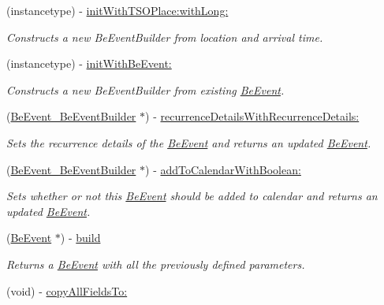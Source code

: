 \begin{DoxyCompactItemize}
\item 
(instancetype) -\/ \hyperlink{interface_be_event___be_event_builder_a3e9d355a5fc1b9f69849773e37ec7403}{init\+With\+T\+S\+O\+Place\+:with\+Long\+:}
\begin{DoxyCompactList}\small\item\em Constructs a new Be\+Event\+Builder from location and arrival time. \end{DoxyCompactList}\item 
(instancetype) -\/ \hyperlink{interface_be_event___be_event_builder_ac88487fd0f086971afac04eb51a0af0b}{init\+With\+Be\+Event\+:}
\begin{DoxyCompactList}\small\item\em Constructs a new Be\+Event\+Builder from existing \hyperlink{interface_be_event}{Be\+Event}. \end{DoxyCompactList}\item 
(\hyperlink{interface_be_event___be_event_builder}{Be\+Event\+\_\+\+Be\+Event\+Builder} $\ast$) -\/ \hyperlink{interface_be_event___be_event_builder_aa2f5445af660771f98e0940983f398cf}{recurrence\+Details\+With\+Recurrence\+Details\+:}
\begin{DoxyCompactList}\small\item\em Sets the recurrence details of the \hyperlink{interface_be_event}{Be\+Event} and returns an updated \hyperlink{interface_be_event}{Be\+Event}. \end{DoxyCompactList}\item 
(\hyperlink{interface_be_event___be_event_builder}{Be\+Event\+\_\+\+Be\+Event\+Builder} $\ast$) -\/ \hyperlink{interface_be_event___be_event_builder_a75fe88e5d200b0e3c8b2c73b3e7f8084}{add\+To\+Calendar\+With\+Boolean\+:}
\begin{DoxyCompactList}\small\item\em Sets whether or not this \hyperlink{interface_be_event}{Be\+Event} should be added to calendar and returns an updated \hyperlink{interface_be_event}{Be\+Event}. \end{DoxyCompactList}\item 
(\hyperlink{interface_be_event}{Be\+Event} $\ast$) -\/ \hyperlink{interface_be_event___be_event_builder_a032b362a94c541b08de82d68cbbe4733}{build}
\begin{DoxyCompactList}\small\item\em Returns a \hyperlink{interface_be_event}{Be\+Event} with all the previously defined parameters. \end{DoxyCompactList}\item 
(void) -\/ \hyperlink{interface_be_event___be_event_builder_abda4b3350bfb4fe3cc12956e31c9cd33}{copy\+All\+Fields\+To\+:}
\end{DoxyCompactItemize}
